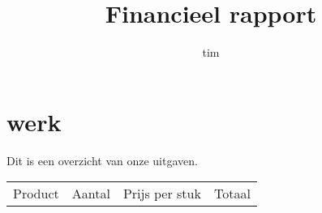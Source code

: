 \documentclass[kulak]{kulakarticle} %
\title{Financieel rapport}
\author{tim}
\begin{document}
\maketitle
	
	\section{werk}
	Dit is een overzicht van onze uitgaven. 
	
	\begin{table}
		\begin{tabular}{l|r|r|l}
			Product & Aantal &  Prijs per stuk  & Totaal
			
			
		\end{tabular}
		
	\end{table}
\end{document}
